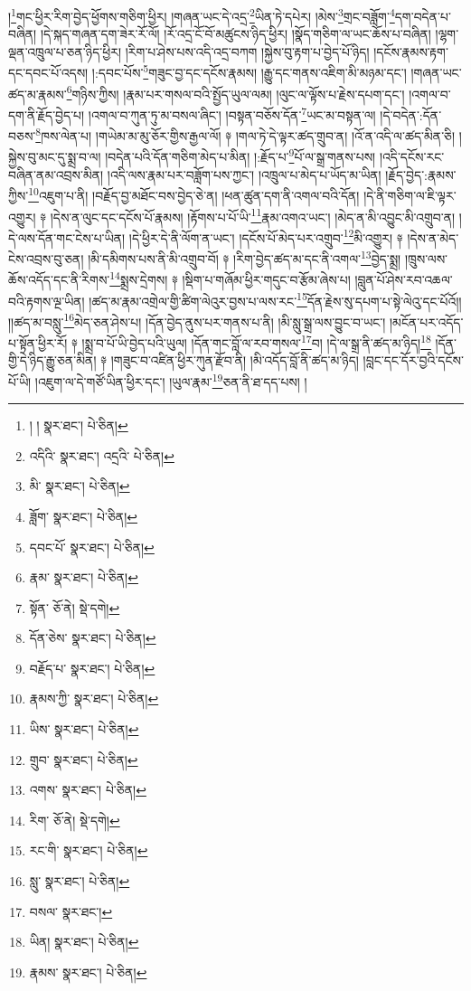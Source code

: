  །\footnote{། །  སྣར་ཐང་།  པེ་ཅིན། }གང་ཕྱིར་རིག་བྱེད་ཕྱོགས་གཅིག་ཕྱིར། །གཞན་ཡང་དེ་འདྲ་\footnote{འདིའི་  སྣར་ཐང་། འདྲའི་  པེ་ཅིན། }ཡིན་ཏེ་དཔེར། །མེས་\footnote{མི་  སྣར་ཐང་།  པེ་ཅིན། }གྲང་བཟློག་\footnote{ཟློག་  སྣར་ཐང་།  པེ་ཅིན། }དག་བདེན་པ་བཞིན། །དེ་སྐད་གཞན་དག་ཟེར་རོ་ལོ། །རོ་འདྲ་ངོ་བོ་མཚུངས་ཉིད་ཕྱིར། །སྣོད་གཅིག་ལ་ཡང་ཆོས་པ་བཞིན། །ལྷག་ལྡན་འཁྲུལ་པ་ཅན་ཉིད་ཕྱིར། །རིག་པ་ཤེས་པས་འདི་འདྲ་བཀག །སྐྱེས་བུ་རྟག་པ་བྱེད་པོ་ཉིད། །དངོས་རྣམས་རྟག་དང་དབང་པོ་འདས། །:དབང་པོས་\footnote{དབང་པོ་  སྣར་ཐང་།  པེ་ཅིན། }གཟུང་བྱ་དང་དངོས་རྣམས། །རྒྱུ་དང་གནས་འཇིག་མི་མཉམ་དང་། །གཞན་ཡང་ཚད་མ་རྣམས་\footnote{རྣམ་  སྣར་ཐང་།  པེ་ཅིན། }གཉིས་ཀྱིས། །རྣམ་པར་གསལ་བའི་སྤྱོད་ཡུལ་ལམ། །ལུང་ལ་ལྟོས་པ་རྗེས་དཔག་དང་། །འགལ་བ་དག་ནི་རྗོད་བྱེད་པ། །འགལ་བ་ཀུན་ཏུ་མ་བསལ་ཞིང་། །བསྟན་བཅོས་དོན་\footnote{སྟོན་  ཅོ་ནེ།  སྡེ་དགེ། }ཡང་མ་བསྟན་ལ། །དེ་བདེན་:དོན་བཅས་\footnote{དོན་ཅེས་  སྣར་ཐང་།  པེ་ཅིན། }ཁས་ལེན་པ། །གཡེམ་མ་མུ་ཅོར་གྱིས་རྒྱལ་ལོ། ༈ །གལ་ཏེ་དེ་ལྟར་ཚད་གྲུབ་ན། །འོ་ན་འདི་ལ་ཚད་མིན་ཅི། །སྐྱེས་བུ་མང་དུ་སྨྲ་བ་ལ། །བདེན་པའི་དོན་གཅིག་མེད་པ་མིན། །:རྗོད་པ་\footnote{བརྗོད་པ་  སྣར་ཐང་།  པེ་ཅིན། }པོ་ལ་སྒྲ་གནས་པས། །འདི་དངོས་རང་བཞིན་ནམ་འབྲས་མིན། །འདི་ལས་རྣམ་པར་བཟློག་པས་ཀྱང་། །འཁྲུལ་པ་མེད་པ་ཡོད་མ་ཡིན། །རྗོད་བྱེད་:རྣམས་ཀྱིས་\footnote{རྣམས་ཀྱི་  སྣར་ཐང་།  པེ་ཅིན། }འཇུག་པ་ནི། །བརྗོད་བྱ་མཐོང་བས་བྱེད་ཅེ་ན། །ཕན་ཚུན་དག་ནི་འགལ་བའི་དོན། །དེ་ནི་གཅིག་ལ་ཇི་ལྟར་འགྱུར། ༈ །དེས་ན་ལུང་དང་དངོས་པོ་རྣམས། །རྟོགས་པ་པོ་ཡི་\footnote{ཡིས་  སྣར་ཐང་།  པེ་ཅིན། }རྣམ་འགའ་ཡང་། །མེད་ན་མི་འབྱུང་མི་འགྲུབ་ན། །དེ་ལས་དོན་གང་ངེས་པ་ཡིན། །དེ་ཕྱིར་དེ་ནི་ལོག་ན་ཡང་། །དངོས་པོ་མེད་པར་འགྲུབ་\footnote{གྲུབ་  སྣར་ཐང་།  པེ་ཅིན། }མི་འགྱུར། ༈ །དེས་ན་མེད་ངེས་འབྲས་བུ་ཅན། །མི་དམིགས་པས་ནི་མི་འགྲུབ་བོ། ༈ །རིག་བྱེད་ཚད་མ་དང་ནི་འགལ་\footnote{འགས་  སྣར་ཐང་།  པེ་ཅིན། }བྱེད་སྨྲ། །ཁྲུས་ལས་ཆོས་འདོད་དང་ནི་རིགས་\footnote{རིག་  ཅོ་ནེ།  སྡེ་དགེ། }སྨྲས་དྲེགས། ༈ །སྡིག་པ་གཞོམ་ཕྱིར་གདུང་བ་རྩོམ་ཞེས་པ། །བླུན་པོ་ཤེས་རབ་འཆལ་བའི་རྟགས་ལྔ་ཡིན། །ཚད་མ་རྣམ་འགྲེལ་གྱི་ཚིག་ལེའུར་བྱས་པ་ལས་རང་\footnote{རང་གི་  སྣར་ཐང་།  པེ་ཅིན། }དོན་རྗེས་སུ་དཔག་པ་སྟེ་ལེའུ་དང་པོའོ།། །།ཚད་མ་བསླུ་\footnote{སླུ་  སྣར་ཐང་།  པེ་ཅིན། }མེད་ཅན་ཤེས་པ། །དོན་བྱེད་ནུས་པར་གནས་པ་ནི། །མི་སླུ་སྒྲ་ལས་བྱུང་བ་ཡང་། །མངོན་པར་འདོད་པ་སྟོན་ཕྱིར་རོ། ༈ །སྨྲ་བ་པོ་ཡི་བྱེད་པའི་ཡུལ། །དོན་གང་བློ་ལ་རབ་གསལ་\footnote{བསལ་  སྣར་ཐང་། }བ། །དེ་ལ་སྒྲ་ནི་ཚད་མ་ཉིད།\footnote{ཡིན།  སྣར་ཐང་།  པེ་ཅིན། } །དོན་གྱི་དེ་ཉིད་རྒྱུ་ཅན་མིན། ༈ །གཟུང་བ་འཛིན་ཕྱིར་ཀུན་རྫོབ་ནི། །མི་འདོད་བློ་ནི་ཚད་མ་ཉིད། །བླང་དང་དོར་བྱའི་དངོས་པོ་ཡི། །འཇུག་ལ་དེ་གཙོ་ཡིན་ཕྱིར་དང་། །ཡུལ་རྣམ་\footnote{རྣམས་  སྣར་ཐང་།  པེ་ཅིན། }ཅན་ནི་ཐ་དད་པས། །
